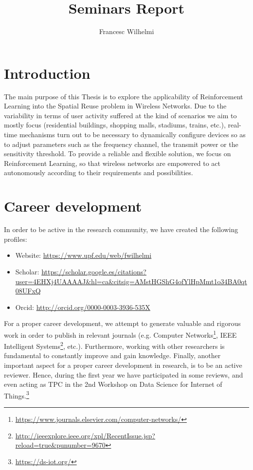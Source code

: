 \documentclass[12pt, a4paper,twoside]{article}
\title{Seminars Report}
\author{Francesc Wilhelmi}
\begin{document}
	\maketitle
	
	
	\section{Introduction}
	\label{section:introduction}		
	The main purpose of this Thesis is to explore the applicability of Reinforcement Learning into the Spatial Reuse problem in Wireless Networks. Due to the variability in terms of user activity suffered at the kind of scenarios we aim to mostly focus (residential buildings, shopping malls, stadiums, trains, etc.), real-time mechanisms turn out to be necessary to dynamically configure devices so as to adjust parameters such as the frequency channel, the transmit power or the sensitivity threshold. To provide a reliable and flexible solution, we focus on Reinforcement Learning, so that wireless networks are empowered to act autonomously according to their requirements and possibilities.
		
	\section{Career development}
	\label{section:career}
	In order to be active in the research community, we have created the following profiles:
	\begin{itemize}
		\item Website: \url{https://www.upf.edu/web/fwilhelmi}
		\item Scholar: \url{https://scholar.google.es/citations?user=4EHXj4UAAAAJ&hl=ca&citsig=AMstHGShG4ofYlHpMmt1o34BA0qt08UFxQ}
		\item Orcid: \url{http://orcid.org/0000-0003-3936-535X}
	\end{itemize}		
	For a proper career development, we attempt to generate valuable and rigorous work in order to publish in relevant journals (e.g. Computer Networks\footnote{\url{https://www.journals.elsevier.com/computer-networks/}}, IEEE Intelligent Systems\footnote{\url{http://ieeexplore.ieee.org/xpl/RecentIssue.jsp?reload=true&punumber=9670}}, etc.). Furthermore, working with other researchers is fundamental to constantly improve and gain knowledge. Finally, another important aspect for a proper career development in research, is to be an active reviewer. Hence, during the first year we have participated in some reviews, and even acting as TPC in the 2nd Workshop on Data Science for Internet of Things.\footnote{\url{https://ds-iot.org/}}
	
\end{document}
